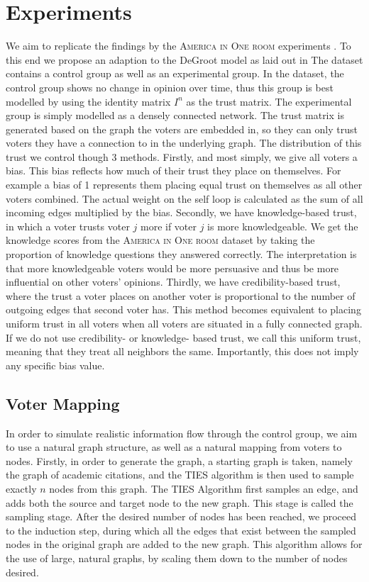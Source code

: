 \section{Experiments} We aim to replicate the findings by the \textsc{America
in One room} experiments \cite{fishkinCanDeliberationHave2024}. To this end we
propose an adaption to the DeGroot model as laid out in 
The dataset contains a control group as well as an experimental group. In the
dataset, the control group shows no change in opinion over time, thus this
group is best modelled by using the identity matrix $I^n$ as the trust matrix.
The experimental group is simply modelled as a densely connected network. The
trust matrix is generated based on the graph the voters are embedded in, so
they can only trust voters they have a connection to in the underlying graph.
The distribution of this trust we control though 3 methods. Firstly, and most
simply, we give all voters a bias. This bias reflects how much of their trust
they place on themselves. For example a bias of 1 represents them placing equal
trust on themselves as all other voters combined. The actual weight on the self
loop is calculated as the sum of all incoming edges multiplied by the bias.
Secondly, we have knowledge-based trust, in which a voter trusts voter $j$ more
if voter $j$ is more knowledgeable. We get the knowledge scores from the
\textsc{America in One room} dataset by taking the proportion of knowledge
questions they answered correctly. The interpretation is that more
knowledgeable voters would be more persuasive and thus be more influential on
other voters' opinions. Thirdly, we have credibility-based trust, where the
trust a voter places on another voter is proportional to the number of outgoing
edges that second voter has. This method
becomes equivalent to placing uniform trust in all voters when all voters are
situated in a fully connected graph. If we do not use credibility- or knowledge-
based trust, we call this uniform trust, meaning that they treat all neighbors
the same. Importantly, this does not imply any specific bias value.

\subsection{Voter Mapping}
In order to simulate realistic information flow through the control group, we aim to use a natural graph structure, as well as a natural mapping from voters to nodes. Firstly, in order to generate the graph, a starting graph is taken, namely the graph of academic citations, and the TIES \cite{ahmedNetworkSamplingStatic2013} algorithm is then used to sample exactly $n$ nodes from this graph. The TIES Algorithm first samples an edge, and adds both the source and target node to the new graph. This stage is called the sampling stage. After the desired number of nodes has been reached, we proceed to the induction step, during which all the edges that exist between the sampled nodes in the original graph are added to the new graph. This algorithm allows for the use of large, natural graphs, by scaling them down to the number of nodes desired.

